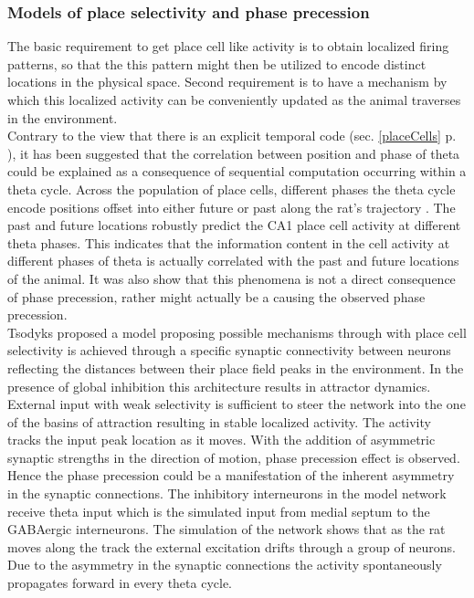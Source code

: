\subsubsection{Models of place selectivity and phase precession}
The basic requirement to get place cell like activity is to obtain localized firing patterns, so that the this pattern might then be utilized to encode distinct locations in the physical space. Second requirement is to have a mechanism by which this localized activity can be conveniently updated as the animal traverses in the environment.\\

Contrary to the view that there is an explicit temporal code (sec. \ref{placeCells} p. \pageref{placeCells}), it has been suggested that the correlation between position and phase of theta could be explained as a consequence of sequential computation occurring within a theta cycle. Across the population of place cells, different phases the theta cycle encode positions offset into either future or past along the rat's trajectory \cite{Itskov2008}. The past and future locations robustly predict the CA1 place cell activity at different theta phases. This indicates that the information content in the cell activity at different phases of theta is actually correlated with the past and future locations of the animal. It was also show that this phenomena is not a direct consequence of phase precession, rather might actually be a causing the observed phase precession. \\

Tsodyks \cite{Tsodyks1996} proposed a model proposing possible mechanisms through with place cell selectivity is achieved through a specific synaptic connectivity between neurons reflecting the distances between their place field peaks in the environment. In the presence of global inhibition this architecture results in attractor dynamics. External input with weak selectivity is sufficient to steer the network into the one of the basins of attraction resulting in stable localized activity. The activity tracks the input peak location as it moves. With the addition of asymmetric synaptic strengths in the direction of motion, phase precession effect is observed. Hence the phase precession could be a manifestation of the inherent asymmetry in the synaptic connections. The inhibitory interneurons in the model network receive theta input which is the simulated input from medial septum to the GABAergic interneurons. The simulation of the network shows that as the rat moves along the track the external excitation drifts through a group of neurons. Due to the asymmetry in the synaptic connections the activity spontaneously propagates forward in every theta cycle. \\  

